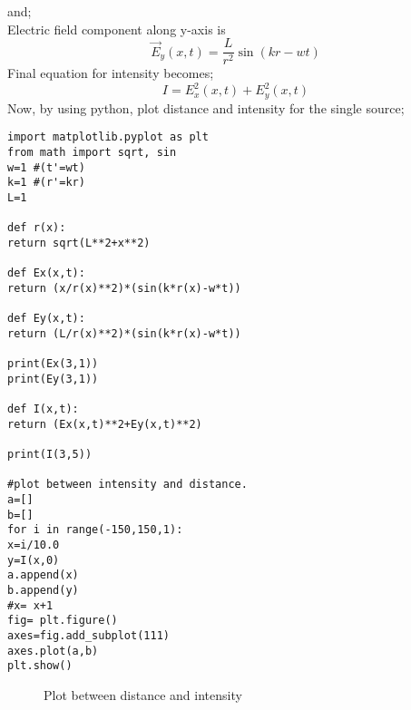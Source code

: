 and;\\
Electric field component along y-axis is\\
\begin{equation}
\vec{E}_y(x,t) = \frac{L}{r^2}\sin(kr-wt)
\end{equation}
Final equation for intensity becomes;\\
\begin{equation}
I = E_x^2(x,t)+E_y^2(x,t)
\end{equation}
Now, by using python, plot distance and intensity for the single source;\\
\begin{verbatim}
import matplotlib.pyplot as plt
from math import sqrt, sin
w=1 #(t'=wt)
k=1 #(r'=kr)
L=1

def r(x):
return sqrt(L**2+x**2)

def Ex(x,t):
return (x/r(x)**2)*(sin(k*r(x)-w*t))

def Ey(x,t):
return (L/r(x)**2)*(sin(k*r(x)-w*t))

print(Ex(3,1))
print(Ey(3,1))

def I(x,t):
return (Ex(x,t)**2+Ey(x,t)**2)

print(I(3,5))

#plot between intensity and distance.
a=[]
b=[]
for i in range(-150,150,1):
x=i/10.0
y=I(x,0)
a.append(x)
b.append(y)
#x= x+1
fig= plt.figure()
axes=fig.add_subplot(111)
axes.plot(a,b)
plt.show()
\end{verbatim}

\begin{figure}[ht]
\centering	
\caption{Plot between distance and intensity}
\end{figure}


